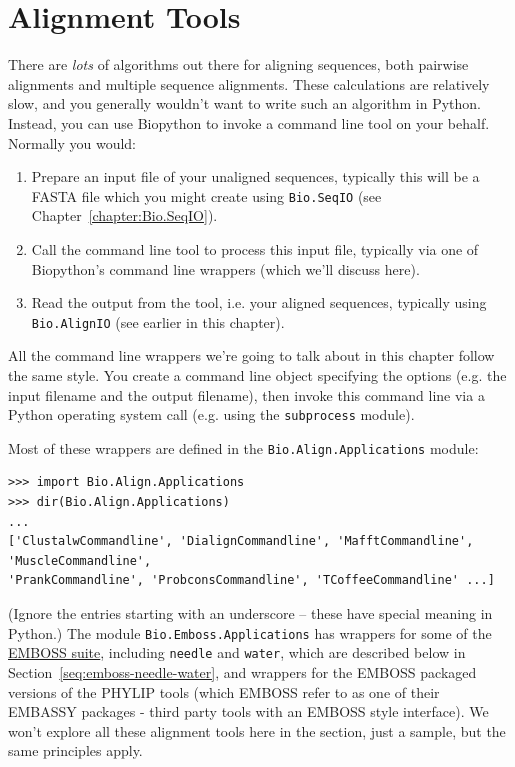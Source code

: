 \documentclass{report}
\begin{document}
\section{Alignment Tools}
\label{sec:alignment-tools}

There are \emph{lots} of algorithms out there for aligning sequences, both pairwise alignments
and multiple sequence alignments. These calculations are relatively slow, and you generally
wouldn't want to write such an algorithm in Python. Instead, you can use Biopython to invoke
a command line tool on your behalf. Normally you would:
\begin{enumerate}
\item Prepare an input file of your unaligned sequences, typically this will be a FASTA file
      which you might create using \verb|Bio.SeqIO| (see Chapter~\ref{chapter:Bio.SeqIO}).
\item Call the command line tool to process this input file, typically via one of Biopython's
      command line wrappers (which we'll discuss here).
\item Read the output from the tool, i.e. your aligned sequences, typically using
      \verb|Bio.AlignIO| (see earlier in this chapter). 
\end{enumerate}

All the command line wrappers we're going to talk about in this chapter follow the same style.
You create a command line object specifying the options (e.g. the input filename and the
output filename), then invoke this command line via a Python operating system call (e.g.
using the \texttt{subprocess} module).

Most of these wrappers are defined in the \verb|Bio.Align.Applications| module:

\begin{verbatim}
>>> import Bio.Align.Applications
>>> dir(Bio.Align.Applications)
...
['ClustalwCommandline', 'DialignCommandline', 'MafftCommandline', 'MuscleCommandline',
'PrankCommandline', 'ProbconsCommandline', 'TCoffeeCommandline' ...]
\end{verbatim}

\noindent (Ignore the entries starting with an underscore -- these have
special meaning in Python.)
The module \verb|Bio.Emboss.Applications| has wrappers for some of the
\href{http://emboss.sourceforge.net/}{EMBOSS suite}, including
\texttt{needle} and \texttt{water}, which are described below in
Section~\ref{seq:emboss-needle-water}, and wrappers for the EMBOSS
packaged versions of the PHYLIP tools (which EMBOSS refer to as one
of their EMBASSY packages - third party tools with an EMBOSS style
interface).
We won't explore all these alignment tools here in the section, just a
sample, but the same principles apply.
\end{document}
